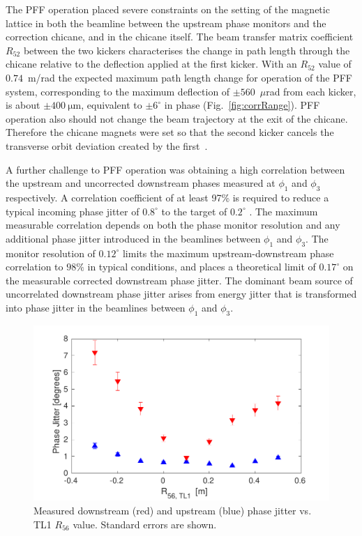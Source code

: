 \documentclass[%
 reprint,
 superscriptaddress,
 amsmath,
 amssymb,
 prl,
]{revtex4-1}
\begin{document}
The PFF operation placed severe constraints on the setting of the 
magnetic lattice in both the beamline between the upstream phase monitors and 
the correction chicane, and in  the chicane itself.
The beam transfer matrix coefficient \(R_{52}\) between the two kickers 
characterises the change in path length through the chicane relative to the 
deflection applied at the first kicker. 
With an \(R_{52}\) value of \(0.74\)~m/rad \cite{RobertsThesis} the expected 
maximum path length change for operation of the PFF system, corresponding to 
the maximum deflection of \(\pm560\)~\(\mu\)rad from each kicker, is about 
\(\pm400~\mathrm{\mu m}\), equivalent to \(\pm6^\circ\) in phase 
(Fig.~\ref{fig:corrRange}). PFF operation also should not change the beam 
trajectory at the exit of the chicane. Therefore the chicane magnets were set 
so that the second kicker cancels the transverse orbit deviation created by the 
first~\cite{RobertsThesis}.

A further challenge to PFF operation was obtaining a high correlation 
between the upstream and uncorrected downstream phases measured at \(\phi_1\) 
and \(\phi_3\) respectively. 
A correlation coefficient of at least 97\% is required to reduce a typical 
incoming phase jitter of \(0.8^\circ\) to the target of \(0.2^\circ\) 
\cite{RobertsThesis}. 
The maximum measurable correlation depends on both the phase monitor resolution 
and any additional phase jitter introduced in the beamlines between \(\phi_1\) 
and \(\phi_3\). The monitor resolution of \(0.12^\circ\) limits the maximum 
upstream-downstream phase correlation to \(98\%\) in typical conditions, and 
places a theoretical limit of \(0.17^\circ\) on the measurable corrected 
downstream phase jitter. 
The dominant beam source of uncorrelated downstream phase jitter 
arises from energy jitter that is transformed into phase jitter in the 
beamlines between \(\phi_1\) and \(\phi_3\). 

\begin{figure}
	\includegraphics[width=\columnwidth]{fig4}
	\caption{\label{fig:r56Scan}Measured downstream (red) and upstream (blue) 
	phase jitter vs. TL1 \(R_{56}\) value. Standard errors are shown.
		}
\end{figure}
\end{document}
